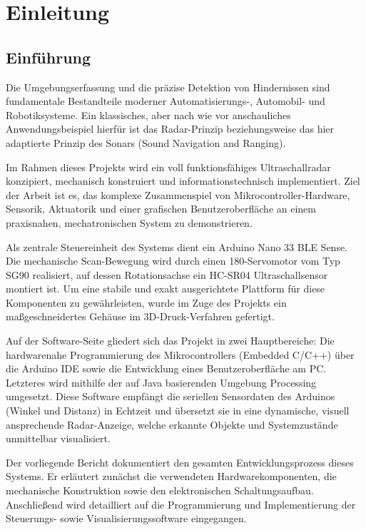 %
%

\part{Einleitung} 

\chapter{Einführung}

Die Umgebungserfassung und die präzise Detektion von Hindernissen sind fundamentale Bestandteile moderner Automatisierungs-, Automobil- und Robotiksysteme. Ein klassisches, aber nach wie vor anschauliches Anwendungsbeispiel hierfür ist das Radar-Prinzip beziehungsweise das hier adaptierte Prinzip des Sonars (Sound Navigation and Ranging). 

Im Rahmen dieses Projekts wird ein voll funktionsfähiges Ultraschallradar konzipiert, mechanisch konstruiert und informationstechnisch implementiert. Ziel der Arbeit ist es, das komplexe Zusammenspiel von Mikrocontroller-Hardware, Sensorik, Aktuatorik und einer grafischen Benutzeroberfläche an einem praxisnahen, mechatronischen System zu demonstrieren.

Als zentrale Steuereinheit des Systems dient ein Arduino Nano 33 BLE Sense. Die mechanische Scan-Bewegung wird durch einen 180\textdegree{}-Servomotor vom Typ SG90 realisiert, auf dessen Rotationsachse ein HC-SR04 Ultraschallsensor montiert ist. Um eine stabile und exakt ausgerichtete Plattform für diese Komponenten zu gewährleisten, wurde im Zuge des Projekts ein ma\ss geschneidertes Gehäuse im 3D-Druck-Verfahren gefertigt. 

Auf der Software-Seite gliedert sich das Projekt in zwei Hauptbereiche: Die hardwarenahe Programmierung des Mikrocontrollers (Embedded C/C++) über die Arduino IDE sowie die Entwicklung eines Benutzeroberfläche am PC. Letzteres wird mithilfe der auf Java basierenden Umgebung Processing umgesetzt. Diese Software empfängt die seriellen Sensordaten des Arduinos (Winkel und Distanz) in Echtzeit und übersetzt sie in eine dynamische, visuell ansprechende Radar-Anzeige, welche erkannte Objekte und Systemzustände unmittelbar visualisiert.

Der vorliegende Bericht dokumentiert den gesamten Entwicklungsprozess dieses Systems. Er erläutert zunächst die verwendeten Hardwarekomponenten, die mechanische Konstruktion sowie den elektronischen Schaltungsaufbau. Anschließend wird detailliert auf die Programmierung und Implementierung der Steuerungs- sowie Visualisierungssoftware eingegangen.